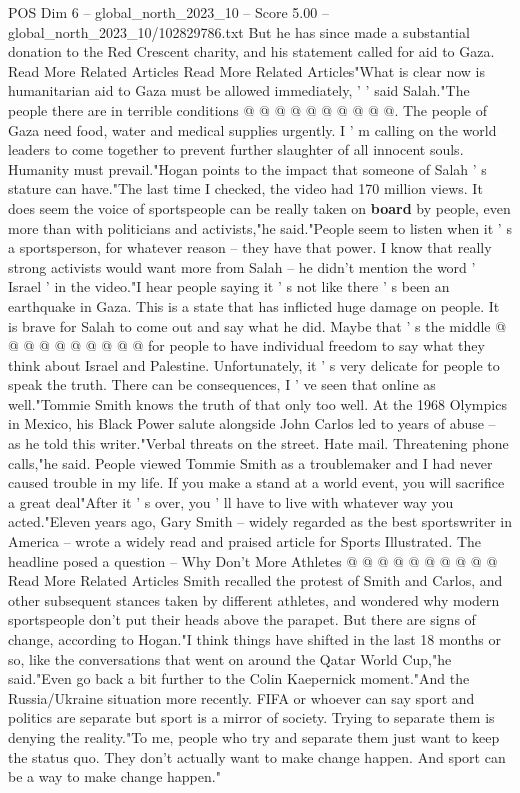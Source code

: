 \begin{textsample}{POS Dim 6 – global\_north\_2023\_10 – Score 5.00 – global\_north\_2023\_10/102829786.txt}
But he has since made a substantial donation to the Red Crescent charity, and his statement called for aid to Gaza.
Read More Related Articles Read More Related Articles"What is clear now is humanitarian aid to Gaza must be allowed immediately, ' ' said Salah."The people there are in terrible conditions @ @ @ @ @ @ @ @ @ @.
The people of Gaza need food, water and medical supplies urgently.
I ' m calling on the world leaders to come together to prevent further slaughter of all innocent souls.
Humanity must prevail."Hogan points to the impact that someone of Salah ' s stature can have."The last time I checked, the video had 170 million views.
It does seem the voice of sportspeople can be really taken on \textbf{board} by people, even more than with politicians and activists,"he said."People seem to listen when it ' s a sportsperson, for whatever reason -- they have that power.
I know that really strong activists would want more from Salah -- he didn't mention the word ' Israel ' in the video."I hear people saying it ' s not like there ' s been an earthquake in Gaza.
This is a state that has inflicted huge damage on people.
It is brave for Salah to come out and say what he did.
Maybe that ' s the middle @ @ @ @ @ @ @ @ @ @ for people to have individual freedom to say what they think about Israel and Palestine.
Unfortunately, it ' s very delicate for people to speak the truth.
There can be consequences, I ' ve seen that online as well."Tommie Smith knows the truth of that only too well.
At the 1968 Olympics in Mexico, his Black Power salute alongside John Carlos led to years of abuse -- as he told this writer."Verbal threats on the street.
Hate mail.
Threatening phone calls,"he said.
People viewed Tommie Smith as a troublemaker and I had never caused trouble in my life.
If you make a stand at a world event, you will sacrifice a great deal"After it ' s over, you ' ll have to live with whatever way you acted."Eleven years ago, Gary Smith -- widely regarded as the best sportswriter in America -- wrote a widely read and praised article for Sports Illustrated.
The headline posed a question -- Why Don't More Athletes @ @ @ @ @ @ @ @ @ @ Read More Related Articles Smith recalled the protest of Smith and Carlos, and other subsequent stances taken by different athletes, and wondered why modern sportspeople don't put their heads above the parapet.
But there are signs of change, according to Hogan."I think things have shifted in the last 18 months or so, like the conversations that went on around the Qatar World Cup,"he said."Even go back a bit further to the Colin Kaepernick moment."And the Russia/Ukraine situation more recently.
FIFA or whoever can say sport and politics are separate but sport is a mirror of society.
Trying to separate them is denying the reality."To me, people who try and separate them just want to keep the status quo.
They don't actually want to make change happen.
And sport can be a way to make change happen."

\end{textsample}
